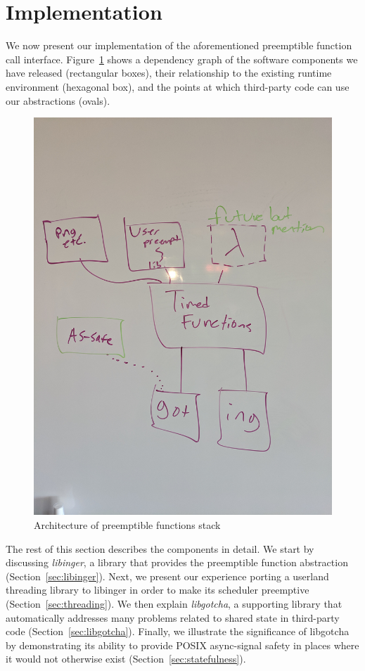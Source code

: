 \section{Implementation}

We now present our implementation of the aforementioned preemptible function call
interface.  Figure~\ref{fig:architecture} shows a dependency graph of the software
components we have released (rectangular boxes), their relationship to the existing
runtime environment (hexagonal box), and the points at which third-party code can use
our abstractions (ovals).

\begin{figure}
\includegraphics[height=\columnwidth]{figs/architecture}
\caption{Architecture of preemptible functions stack}
\label{fig:architecture}
\end{figure}

The rest of this section describes the components in detail.  We start by discussing
\textit{libinger}, a library that provides the preemptible function abstraction
(Section~\ref{sec:libinger}).  Next, we present our experience porting a userland
threading library to libinger in order to make its scheduler preemptive
(Section~\ref{sec:threading}).  We then explain \textit{libgotcha}, a supporting
library that automatically addresses many problems related to shared state in
third-party code (Section~\ref{sec:libgotcha}).  Finally, we illustrate the
significance of libgotcha by demonstrating its ability to provide POSIX async-signal
safety in places where it would not otherwise exist (Section~\ref{sec:statefulness}).



